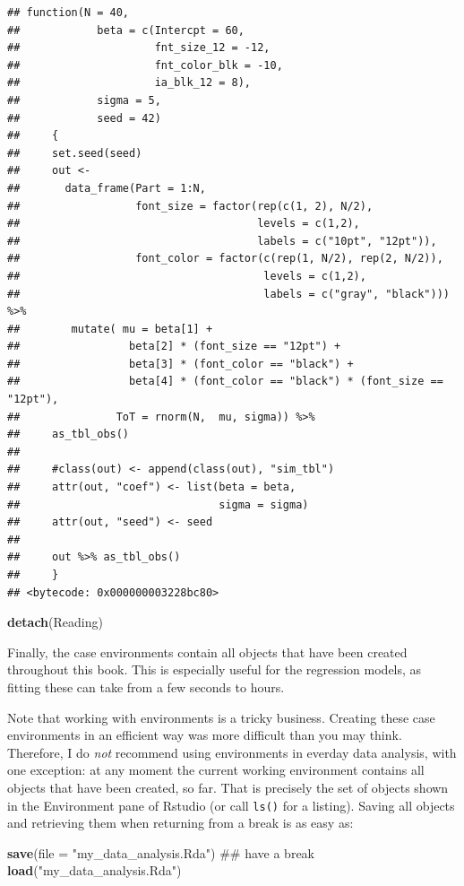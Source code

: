 \documentclass[]{svmono}
\newenvironment{Shaded}{\begin{snugshade}}{\end{snugshade}}
\newcommand{\KeywordTok}[1]{\textcolor[rgb]{0.13,0.29,0.53}{\textbf{#1}}}
\newcommand{\DataTypeTok}[1]{\textcolor[rgb]{0.13,0.29,0.53}{#1}}
\newcommand{\StringTok}[1]{\textcolor[rgb]{0.31,0.60,0.02}{#1}}
\newcommand{\NormalTok}[1]{#1}
\theoremstyle{definition}
\theoremstyle{definition}
\theoremstyle{definition}
\theoremstyle{remark}
\begin{document}
\begin{verbatim}
## function(N = 40,
##            beta = c(Intercpt = 60, 
##                     fnt_size_12 = -12, 
##                     fnt_color_blk = -10, 
##                     ia_blk_12 = 8),
##            sigma = 5,
##            seed = 42) 
##     {
##     set.seed(seed)
##     out <-
##       data_frame(Part = 1:N,
##                  font_size = factor(rep(c(1, 2), N/2), 
##                                     levels = c(1,2), 
##                                     labels = c("10pt", "12pt")),
##                  font_color = factor(c(rep(1, N/2), rep(2, N/2)),
##                                      levels = c(1,2), 
##                                      labels = c("gray", "black"))) %>%
##        mutate( mu = beta[1] + 
##                 beta[2] * (font_size == "12pt") +
##                 beta[3] * (font_color == "black") +
##                 beta[4] * (font_color == "black") * (font_size == "12pt"),
##               ToT = rnorm(N,  mu, sigma)) %>% 
##     as_tbl_obs()
##     
##     #class(out) <- append(class(out), "sim_tbl")
##     attr(out, "coef") <- list(beta = beta,
##                               sigma = sigma)
##     attr(out, "seed") <- seed
##     
##     out %>% as_tbl_obs()
##     }
## <bytecode: 0x000000003228bc80>
\end{verbatim}

\begin{Shaded}
\begin{Highlighting}[]
\KeywordTok{detach}\NormalTok{(Reading)}
\end{Highlighting}
\end{Shaded}

Finally, the case environments contain all objects that have been
created throughout this book. This is especially useful for the
regression models, as fitting these can take from a few seconds to
hours.

Note that working with environments is a tricky business. Creating these
case environments in an efficient way was more difficult than you may
think. Therefore, I do \emph{not} recommend using environments in
everday data analysis, with one exception: at any moment the current
working environment contains all objects that have been created, so far.
That is precisely the set of objects shown in the Environment pane of
Rstudio (or call \texttt{ls()} for a listing). Saving all objects and
retrieving them when returning from a break is as easy as:

\begin{Shaded}
\begin{Highlighting}[]
\KeywordTok{save}\NormalTok{(}\DataTypeTok{file =} \StringTok{"my_data_analysis.Rda"}\NormalTok{)}
\NormalTok{## have a break}
\KeywordTok{load}\NormalTok{(}\StringTok{"my_data_analysis.Rda"}\NormalTok{)}
\end{Highlighting}
\end{Shaded}
\end{document}
